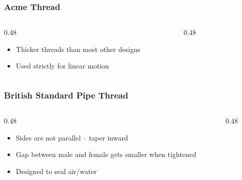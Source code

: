 \begin{frame}
	\frametitle{Acme Thread}

    \begin{columns}
        \begin{column}{0.48\linewidth}
            \begin{itemize}[<+- | alert@+>]
                \item Thicker threads than most other designs
                \item Used strictly for linear motion
            \end{itemize}
        \end{column}
        \begin{column}{0.48\linewidth}
            \begin{figure}
                \centering
                \resizebox{\linewidth}{!}{
                    
                }
            \end{figure}
        \end{column}
    \end{columns}
\end{frame}

\begin{frame}
	\frametitle{British Standard Pipe Thread}

    \begin{columns}
        \begin{column}{0.48\linewidth}
            \begin{itemize}[<+- | alert@+>]
                \item Sides are not parallel -- taper inward
                \item Gap between male and female gets smaller when tightened
                \item Designed to seal air/water
            \end{itemize}
        \end{column}
        \begin{column}{0.48\linewidth}
        \end{column}
    \end{columns}
\end{frame}

